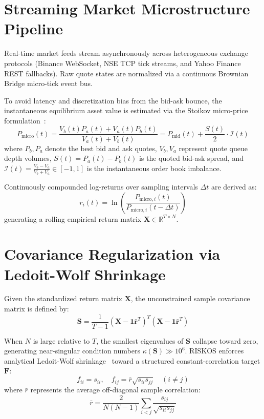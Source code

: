 \documentclass[10pt,journal,compsoc]{IEEEtran}
\begin{document}
\section{Streaming Market Microstructure Pipeline}
\label{sec:microstructure}
Real-time market feeds stream asynchronously across heterogeneous exchange protocols (Binance WebSocket, NSE TCP tick streams, and Yahoo Finance REST fallbacks). Raw quote states are normalized via a continuous Brownian Bridge micro-tick event bus.

To avoid latency and discretization bias from the bid-ask bounce, the instantaneous equilibrium asset value is estimated via the Stoikov micro-price formulation~\cite{stoikov2018microstructure}:
\begin{equation}
P_{\text{micro}}(t) = \frac{V_b(t) P_a(t) + V_a(t) P_b(t)}{V_a(t) + V_b(t)} = P_{\text{mid}}(t) + \frac{S(t)}{2} \cdot \mathcal{I}(t)
\end{equation}
where $P_b, P_a$ denote the best bid and ask quotes, $V_b, V_a$ represent quote queue depth volumes, $S(t) = P_a(t) - P_b(t)$ is the quoted bid-ask spread, and $\mathcal{I}(t) = \frac{V_b - V_a}{V_b + V_a} \in [-1, 1]$ is the instantaneous order book imbalance.

Continuously compounded log-returns over sampling intervals $\Delta t$ are derived as:
\begin{equation}
r_i(t) = \ln \left( \frac{P_{\text{micro},i}(t)}{P_{\text{micro},i}(t - \Delta t)} \right)
\end{equation}
generating a rolling empirical return matrix $\mathbf{X} \in \mathbb{R}^{T \times N}$.

\section{Covariance Regularization via Ledoit-Wolf Shrinkage}
\label{sec:covariance}
Given the standardized return matrix $\mathbf{X}$, the unconstrained sample covariance matrix is defined by:
\begin{equation}
\mathbf{S} = \frac{1}{T - 1} (\mathbf{X} - \mathbf{1}\bar{\mathbf{r}}^T)^T (\mathbf{X} - \mathbf{1}\bar{\mathbf{r}}^T)
\end{equation}

When $N$ is large relative to $T$, the smallest eigenvalues of $\mathbf{S}$ collapse toward zero, generating near-singular condition numbers $\kappa(\mathbf{S}) \gg 10^6$. RISKOS enforces analytical Ledoit-Wolf shrinkage~\cite{ledoit2004well} toward a structured constant-correlation target $\mathbf{F}$:
\begin{equation}
f_{ii} = s_{ii}, \quad f_{ij} = \bar{r} \sqrt{s_{ii} s_{jj}} \quad (i \neq j)
\end{equation}
where $\bar{r}$ represents the average off-diagonal sample correlation:
\begin{equation}
\bar{r} = \frac{2}{N(N - 1)} \sum_{i < j} \frac{s_{ij}}{\sqrt{s_{ii} s_{jj}}}
\end{equation}
\end{document}
